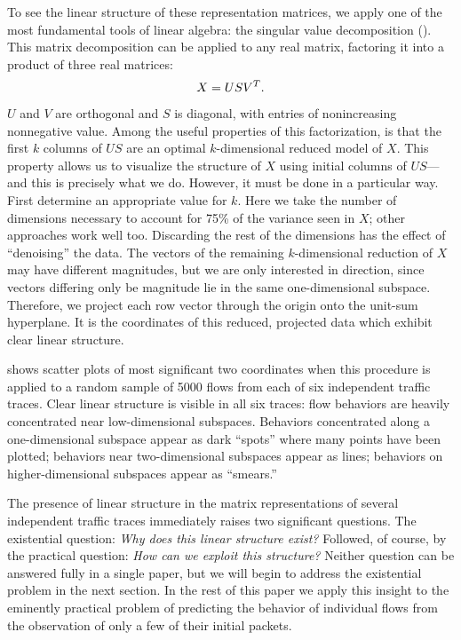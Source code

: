 \documentclass[conference]{IEEEtran}
\begin{document}
To see the linear structure of these representation matrices, we apply one of the most fundamental tools of linear algebra:
the singular value decomposition ().
This matrix decomposition can be applied to any real matrix, factoring it into a product of three real matrices:
\begin{align}
  X = US{V}^T.
\end{align}
$U$ and $V$ are orthogonal and $S$ is diagonal, with entries of nonincreasing nonnegative value.
Among the useful properties of this factorization, is that the first $k$ columns of $US$ are an optimal $k$-dimensional reduced model of $X$.\svdnote
This property allows us to visualize the structure of $X$ using initial columns of $US$---and this is precisely what we do.
However, it must be done in a particular way.
First determine an appropriate value for $k$.
Here we take the number of dimensions necessary to account for 75\% of the variance seen in $X$;
other approaches work well too.
Discarding the rest of the dimensions has the effect of ``denoising'' the data.
The vectors of the remaining $k$-dimensional reduction of $X$ may have different magnitudes, but we are only interested in direction, since vectors differing only be magnitude lie in the same one-dimensional subspace.
Therefore, we project each row vector through the origin onto the unit-sum hyperplane.\projectionnote
It is the coordinates of this reduced, projected data which exhibit clear linear structure.

 shows scatter plots of most significant two coordinates when this procedure is applied to a random sample of 5000 flows from each of six independent traffic traces.
Clear linear structure is visible in all six traces:
flow behaviors are heavily concentrated near low-dimensional subspaces.
Behaviors concentrated along a one-dimensional subspace appear as dark ``spots'' where many points have been plotted;
behaviors near two-dimensional subspaces appear as lines;
behaviors on higher-dimensional subspaces appear as ``smears.''

The presence of linear structure in the matrix representations of several independent traffic traces immediately raises two significant questions.
The existential question: \emph{Why does this linear structure exist?}
Followed, of course, by the practical question: \emph{How can we exploit this structure?}
Neither question can be answered fully in a single paper, but we will begin to address the existential problem in the next section.
In the rest of this paper we apply this insight to the eminently practical problem of predicting the behavior of individual flows from the observation of only a few of their initial packets.
\end{document}

